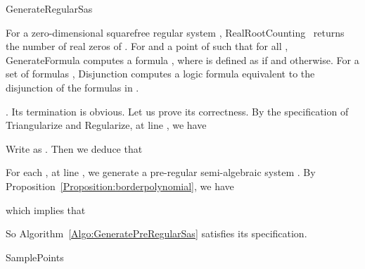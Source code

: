 \documentclass{sig-alternate}
\newcommand{\GenerateRegularSas}[1]{\mbox{{\sf GenerateRegularSas}}}
\newcommand{\GenerateFormula}[1]{\mbox{{\sf GenerateFormula}}}
\newcommand{\RealRootCounting}[1]{\mbox{{\sf RealRootCounting}}}
\newcommand{\ReviseFormula}[1]{\mbox{{\sf Disjunction}}}
\newcommand{\SamplePoints}[1]{\mbox{{\sf SamplePoints}}}
\begin{document}
\begin{algorithm}
\dontprintsemicolon
\linesnumbered
\caption{\GenerateRegularSas{B, T, P}\label{Algo:GenerateRegularSas}}
\; 

\end{algorithm}


\smallskip{}
For a zero-dimensional squarefree regular system 
, \RealRootCounting{T, P}~\cite{xz06} 
returns the number of real zeros of .
For  and a point  of 
such that  for all , \GenerateFormula{A, s}
computes a formula , where  is defined 
as  if  and  otherwise.
For a  set of formulas ,
\ReviseFormula{G} computes a logic formula  
equivalent to
the disjunction of the formulas in .


\smallskip{}.
Its termination is obvious.
Let us prove its correctness.
By the specification of {\sf Triangularize} and {\sf Regularize},
at line , we have

Write  as . Then we deduce that

For each ,
at line , we generate
a pre-regular semi-algebraic system .
By Proposition~\ref{Proposition:borderpolynomial}, we have

which implies that

So Algorithm~\ref{Algo:GeneratePreRegularSas}
satisfies its specification.


\begin{algorithm}
\dontprintsemicolon
\linesnumbered
\caption{\SamplePoints{A, k}\label{Algo:SamplePoints}}
\end{algorithm}
\end{document}
